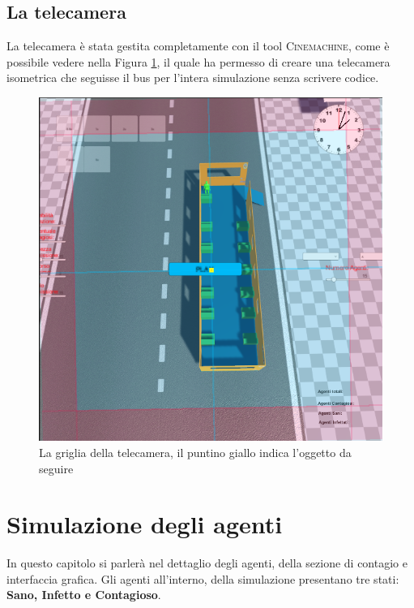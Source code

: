 \documentclass[12pt, openany]{book}
\begin{document}
 
 	\section{La telecamera}
 	La telecamera è stata gestita completamente con il tool \textsc{Cinemachine}, come è possibile vedere nella Figura \ref{fig:Cinemachine}, il quale ha permesso di creare una telecamera isometrica che seguisse il bus per l'intera simulazione senza scrivere codice.
 	\begin{figure}[H]
 		\centering
 		\includegraphics[width=0.7\linewidth]{"Immagini/Cinemachine.png"}
 		\caption{La griglia della telecamera, il puntino giallo indica l'oggetto da seguire}
 		\label{fig:Cinemachine}
 	\end{figure}


\chapter{Simulazione degli agenti}
	In questo capitolo si parlerà nel dettaglio degli agenti, della sezione di contagio e interfaccia grafica. Gli agenti all'interno, della simulazione presentano tre stati: \textbf{Sano, Infetto e Contagioso}.
\end{document}
